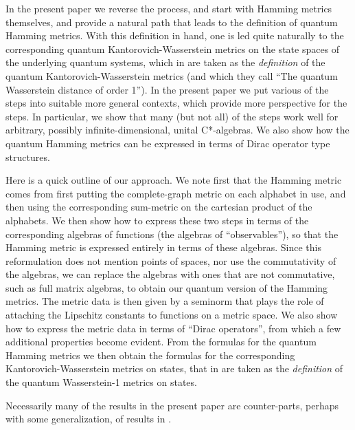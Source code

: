 \documentclass{amsart}[14pt]
\theoremstyle{definition}
\theoremstyle{remark}
\newcommand{\<}{\langle}
\renewcommand{\>}{\rangle}
\numberwithin{equation}{section}
\begin{document}
{In the present paper we reverse the process, and start with 
Hamming metrics themselves, and provide a natural path 
that leads to the definition of quantum Hamming metrics. 
With this definition in hand, one is led quite naturally to the
corresponding quantum Kantorovich-Wasserstein metrics on 
the state spaces of the underlying quantum systems, 
which in \cite{DMTL} are taken as the \emph{definition} of the quantum 
Kantorovich-Wasserstein metrics (and which they call
``The quantum Wasserstein distance of order 1''). 
In the present paper we put 
various of the steps into suitable more general contexts, 
which provide more perspective for the steps. In particular,
we show that many (but not all) of the steps work well
for arbitrary, possibly infinite-dimensional, unital C*-algebras. 
We also show how the 
quantum Hamming metrics can be expressed in terms of
Dirac operator type structures.

Here is a quick outline of our approach. We note first that the Hamming 
metric comes from first putting the complete-graph metric on each 
alphabet in use, and then using the corresponding  sum-metric on 
the cartesian product of the alphabets.
We then show how to express these two steps in terms of 
the corresponding algebras
of functions (the algebras of ``observables''), so that the Hamming metric
is expressed entirely in terms of these algebras. Since this reformulation 
does not mention points of spaces, nor use the commutativity of the algebras, 
we can replace the algebras with ones that are not commutative, such as full 
matrix algebras, to obtain our quantum version of the Hamming metrics. The 
metric data is then given by a seminorm that plays the role of attaching the 
Lipschitz constants to functions on a metric space. We also show
how to express the metric data in terms of ``Dirac operators'', from which
a few additional properties become evident. From the
formulas for the quantum Hamming metrics we then obtain the formulas
for the corresponding Kantorovich-Wasserstein metrics on states, 
that in \cite{DMTL} are taken as the \emph{definition} of the quantum
Wasserstein-1 metrics on states.

Necessarily many of the results in the present paper are 
counter-parts, perhaps with some
generalization, of results in \cite{DMTL}.

}
\end{document}
